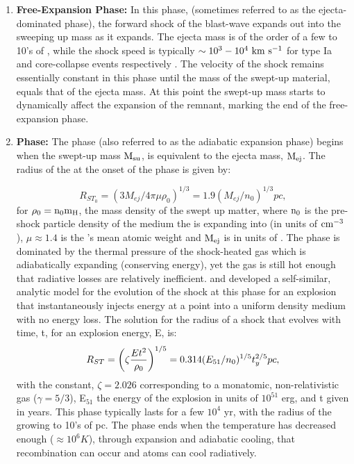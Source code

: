 \begin{enumerate}
	\item \textbf{ Free-Expansion Phase:} In this phase, (sometimes referred to as the ejecta-dominated phase), the forward shock of the blast-wave expands out into the \ism{} sweeping up mass as it expands. The ejecta mass is of the order of a few to 10's of \msun{}, while the shock speed is typically ${\rm \sim 10^3-10^4~ km~s^{-1}}$ for type Ia and core-collapse events respectively \cite{Reynolds08}. The velocity of the shock remains essentially constant in this phase until the mass of the swept-up material, equals that of the ejecta mass.
	At this point the swept-up mass starts to dynamically affect the expansion of the remnant, marking the end of the free-expansion phase.
	
	\item \textbf{\sedt{} Phase:} The \sedt{} phase (also referred to as the adiabatic expansion phase) begins when the swept-up mass ${\rm M_{su}}$, is equivalent to the ejecta mass, ${\rm M_{ej}}$. The radius of the \snr{} at the onset of the \sedt{} phase is given by:
	 
	\begin{equation}
	R_{ST_0} = (3M_{ej}/4\pi \mu \rho_0)^{1/3} = 1.9(M_{ej}/n_0)^{1/3} pc,
	\end{equation}
	for ${\rm \rho_0 = n_0m_H}$, the mass density of the swept up matter, where 
	${\rm n_0}$ is the pre-shock particle density of the medium the \snr{} is expanding into (in units of ${\rm cm^{-3}}$), $\mu\approx1.4$ is the \ism{}'s mean atomic weight and ${\rm M_{ej}}$ is in units of \msun{}. The \sedt{} phase is dominated by the thermal pressure of the shock-heated gas which is adiabatically expanding (conserving energy), yet the gas is still hot enough that radiative losses are relatively inefficient. \cite{1959sdmm.book.....S} and \cite{Taylor50} developed a self-similar, analytic model for the evolution of the shock at this phase for an explosion that instantaneously injects energy at a point into a uniform density medium with no energy loss. The \sedt{} solution for the radius of a shock that evolves with time, t, for an explosion energy, E, is:
	\begin{equation}
	R_{ST} = \bigg{(}\zeta \frac{Et^2}{\rho_0} \bigg{)}^{{1/5}} = 0.314(E_{51}/n_0)^{1/5}t_{y}^{2/5} pc,
	\end{equation}
	with the constant, $\zeta = 2.026$ corresponding to a monatomic, non-relativistic  gas ($\gamma = 5/3$), E$_{51}$ the energy of the explosion in units of $10^{51}$ erg, and t given in years. This phase typically lasts for a few $10^4$ yr, with the radius of the \snr{} growing to 10's of pc. The \sedt{} phase ends when the temperature has decreased enough ($\approx 10^6 K$), through expansion and adiabatic cooling, that recombination can occur and atoms can cool radiatively.
	

\end{enumerate}
